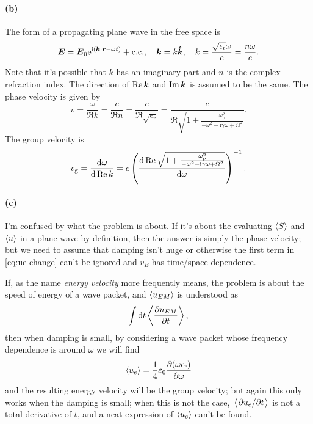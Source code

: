 \documentclass[hyperref, a4paper]{article}
\newcommand*{\ii}{\mathrm{i}}
\newcommand*{\ee}{\mathrm{e}}
\newcommand*{\term}[1]{\textit{#1}}
\newcommand*{\omegap}{\omega_{\text{p}}}
\newcommand{\epsr}{\epsilon_{\text{r}}}
\begin{document}
\paragraph{(b)}
The form of a propagating plane wave in the free space is 
\begin{equation}
    \vb*{E} = \vb*{E}_0 \ee^{\ii (\vb*{k} \cdot \vb*{r} - \omega t)} + \text{c.c.}, \quad 
    \vb*{k} = k \vu*{k}, \quad k = \frac{\sqrt{\epsr} \omega}{c} = \frac{n \omega}{c}.
\end{equation}
Note that it's possible that $k$ has an imaginary part 
and $n$ is the complex refraction index.
The direction of $\Re \vb*{k}$ and $\Im \vb*{k}$ 
is assumed to be the same.
The phase velocity is given by 
\begin{equation}
    v = \frac{\omega}{\Re k} = \frac{c}{\Re n} = \frac{c}{\Re \sqrt{\epsr}}
    = \frac{c}{
        \Re \sqrt{
            1 + \frac{\omegap^2}{- \omega^2 - \ii \gamma \omega + \Omega^2}
        }
    }.
\end{equation}
The group velocity is 
\begin{equation}
    v_{\text{g}} = \frac{\dd{\omega}}{\dd{\Re k}}
    = c \left(
        \dv{
            \Re \sqrt{
                1 + \frac{\omegap^2}{- \omega^2 - \ii \gamma \omega + \Omega^2}
            }
        }{\omega}
    \right)^{-1}.
\end{equation}

\paragraph{(c)} I'm confused by what the problem is about.
If it's about the evaluating $\expval{S}$ and $\expval{u}$ 
in a plane wave by definition, 
then the answer is simply the phase velocity;
but we need to assume that damping isn't huge 
or otherwise the first term in \eqref{eq:ue-change} 
can't be ignored and $v_E$ has time/space dependence.

If, as the name \term{energy velocity} more frequently means, 
the problem is about the speed of energy of a wave packet, 
and $\expval{u_{EM}}$ is understood as 
\[
    \int \dd{t} \expval{\pdv{u_{EM}}{t}},
\]
then when damping is small, 
by considering a wave packet whose frequency dependence is around $\omega$ 
we will find 
\begin{equation}
    \expval{u_{e}} = \frac{1}{4} \varepsilon_0 \pdv{(\omega \epsr)}{\omega} 
\end{equation}
and the resulting energy velocity will be the group velocity;
but again this only works when the damping is small;
when this is not the case, 
$\expval*{\pdv*{u_e}{t}}$ is not a total derivative of $t$,
and a neat expression of $\expval{u_e}$ can't be found.
\end{document}
